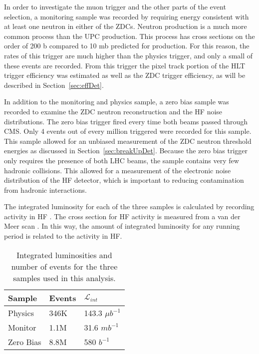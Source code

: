       In order to investigate the muon trigger and the other parts of the event 
        selection, a monitoring sample was recorded by requiring energy 
        consistent with at least one neutron in either of the ZDCs.
      Neutron production is a much more common process than the UPC \JPsi{} 
        production.
      This process has cross sections on the order of 200 b compared
        to 10 mb predicted for \JPsi{} production. 
      For this reason, the rates of this trigger are much higher than the physics
        trigger, and only a small \DIFdelbegin {}\DIFdelend \DIFaddbegin {}\DIFaddend of these events are recorded.
      From this trigger the pixel track portion of the HLT trigger efficiency 
        was estimated as well as the ZDC trigger efficiency, as will be described 
        in Section~\ref{sec:effDet}. 

      In addition to the monitoring and physics sample, a zero bias sample was 
        recorded to examine the ZDC neutron reconstruction and the HF noise 
        distributions. 
      The zero bias trigger fired every time both beams passed through CMS. 
      Only 4 events out of every million triggered were recorded for this sample. 
      This sample allowed for an unbiased measurement of the ZDC neutron 
        threshold energies as discussed in Section~\ref{sec:breakUpDet}. 
      Because the zero bias trigger only requires the presence of both LHC 
        beams, the sample contains very few hadronic collisions. 
      This allowed for a measurement of the electronic noise distribution of
        the HF detector, which is important to reducing contamination from 
        hadronic interactions.

      The integrated luminosity for each of the three samples is calculated
        by recording activity in HF \cite{cmsLumi}. 
      The cross section for HF activity is measured from a van der Meer scan 
        \cite{vanderMeer:1968zz}. 
      In this way, the amount of integrated luminosity for any running period is
        related to the activity in HF. 
      \begin{table}
  	    \centering
  	    \begin{tabular}{|l|l|l|}
  	      \hline Sample & Events & $\mathcal{L}_{int}$ \\ \hline \hline
          Physics & 346K & 143.3 $\mu$$b^{-1}$ \\ \hline
          Monitor & 1.1M & 31.6 $mb^{-1}$ \\ \hline
          Zero Bias & 8.8M & 580 $b^{-1}$ \\ \hline 
  	    \end{tabular}
  	    \caption{Integrated luminosities and number of events for the three
  	      samples used in this analysis.}
  	    \label{tab:sampleLumiNevt}
      \end{table}

